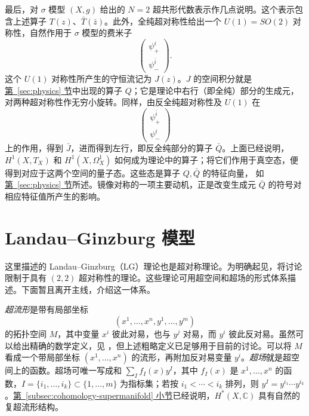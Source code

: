 最后，对 $\sigma$ 模型 $(X,g)$ 给出的 $N=2$ 超共形代数表示作几点说明。这个表示包含上述算子 $T(z)$、$\bar T(\bar z)$。此外，全纯超对称性给出一个 $U(1)=SO(2)$ 对称性，自然作用于 $\sigma$ 模型的费米子
\[
\begin{pmatrix}\psi_+^i\\\psi_-^{\bar i}\end{pmatrix}.
\]
这个 $U(1)$ 对称性所产生的守恒流记为 $J(z)$。$J$ 的空间积分就是\hyperref[sec:physics]{第~\ref*{sec:physics} 节}中出现的算子 $Q$；它是理论中右行（即全纯）部分的生成元，对两种超对称性作无穷小旋转。同样，由反全纯超对称性及 $U(1)$ 在
\[
\begin{pmatrix}\psi_+^{\bar i}\\\psi_-^i\end{pmatrix}
\]
上的作用，得到 $\bar J$，进而得到左行，即反全纯部分的算子 $\bar Q$。上面已经说明，$H^1(X,T_X)$ 和 $H^1(X,\Omega_X^1)$ 如何成为理论中的算子；将它们作用于真空态，便得到对应于这两个空间的量子态。这些态是算子 $Q,\bar Q$ 的特征向量，
如\hyperref[sec:physics]{第~\ref*{sec:physics} 节}所述。镜像对称的一项主要动机，正是改变生成元 $\bar Q$ 的符号对相应特征值所产生的影响。

\section{Landau--Ginzburg 模型}\label{sec:landau-ginzburg-models}
这里描述的 Landau--Ginzburg（LG）理论也是超对称理论。为明确起见，将讨论限制于具有 $(2,2)$ 超对称性的理论。这些理论可用超空间和超场的形式体系描述。下面暂且离开主线，介绍这一体系。

\emph{超流形}是带有局部坐标
\[
(x^1,\ldots,x^n,y^1,\ldots,y^m)
\]
的拓扑空间 $M$，其中变量 $x^i$ 彼此对易，也与 $y^j$ 对易，而 $y^i$ 彼此反对易。虽然可以给出精确的数学定义，见 ，但上述粗略定义已足够用于目前的讨论。可以将 $M$ 看成一个带局部坐标 $(x^1,\ldots,x^n)$ 的流形，再附加反对易变量 $y^i$。\emph{超场}就是超空间上的函数。超场可唯一写成和 $\sum_I f_I(x)y^I$，其中 $f_I(x)$ 是 $x^1,\ldots,x^n$ 的函数，$I=\{i_1,\ldots,i_k\}\subset\{1,\ldots,m\}$ 为指标集；若按 $i_1<\cdots<i_k$ 排列，则 $y^I=y^{i_1}\cdots y^{i_k}$。\hyperref[subsec:cohomology-supermanifold]{第~\ref*{subsec:cohomology-supermanifold} 小节}已经说明，$H^*(X,\mathbb C)$ 具有自然的复超流形结构。


